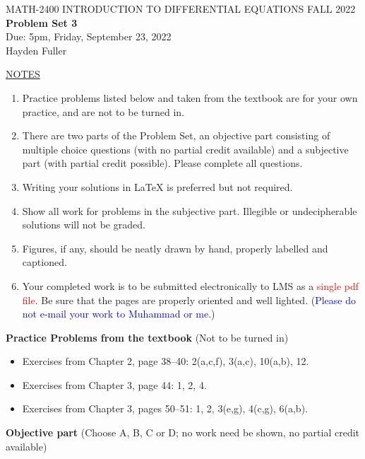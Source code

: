 \documentclass{article}
\begin{document}
\begin{center}
\large{ MATH-2400 \hspace{.27in}  INTRODUCTION TO DIFFERENTIAL EQUATIONS \hspace{.27in}FALL 2022\bigskip\\ {\bf Problem Set 3} \smallskip\\ Due: 5pm, Friday, September 23, 2022}
\\Hayden Fuller
\end{center}

\bigskip\noindent
\underline{NOTES}
\begin{enumerate}
\item Practice problems listed below and taken from the textbook are for your own practice, and are not to be turned in.
\item There are two parts of the Problem Set, an objective part consisting of multiple choice questions (with no partial credit available) and a subjective part (with partial credit possible).  Please complete all questions.
\item Writing your solutions in {\LaTeX} is preferred but not required.
\item Show all work for problems in the subjective part.  Illegible or undecipherable solutions will not be graded. 
\item Figures, if any, should be neatly drawn by hand, properly labelled and captioned.  
\item Your completed work is to be submitted electronically to LMS  as a \textcolor{red}{single pdf file}. Be sure that the pages are properly oriented and well lighted.  (\textcolor{blue}{Please do not e-mail your work to Muhammad or me.})
\end{enumerate}

\bigskip\noindent
{\bf Practice Problems from the textbook} (Not to be turned in)
\begin{itemize}
\item
Exercises from Chapter 2, page 38--40: 2(a,c,f), 3(a,c), 10(a,b), 12.
\item
Exercises from Chapter 3, page 44: 1, 2, 4.
\item
Exercises from Chapter 3, pages 50--51: 1, 2, 3(e,g), 4(c,g), 6(a,b).
\end{itemize}

\bigskip\noindent
{\bf Objective part} (Choose A, B, C or D; no work need be shown, no partial credit available)
\end{document}
